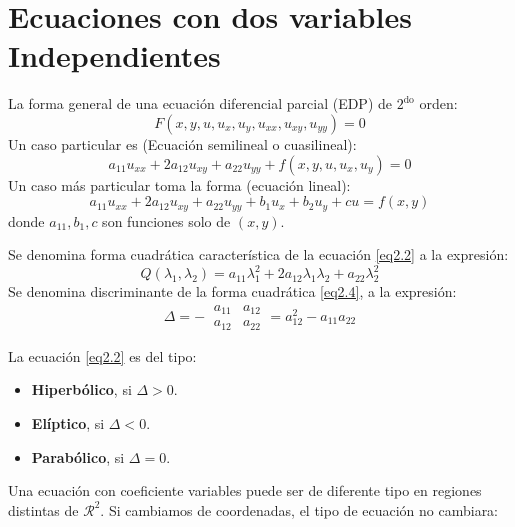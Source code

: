 \documentclass[../main]{subfiles}
\begin{document}
\section{Ecuaciones con dos variables Independientes}
La forma general de una ecuación diferencial parcial (EDP) de $2^{\text{do}}$ orden:
\begin{equation}
    F(x,y,u,u_x,u_y,u_{xx},u_{xy},u_{yy})=0
\end{equation}
Un caso particular es (Ecuación semilineal o cuasilineal):
\begin{equation}
    a_{11}u_{xx}+2a_{12}u_{xy}+a_{22}u_{yy}+f(x,y,u,u_x,u_y)=0
\end{equation}
Un caso más particular toma la forma (ecuación lineal):
\begin{equation}
    a_{11}u_{xx}+2a_{12}u_{xy}+a_{22}u_{yy}+b_1 u_x+b_2 u_y+cu=f(x,y)
    \label{eq2.2}
\end{equation}
donde $a_{11}, b_1, c$ son funciones solo de $(x,y)$.
\begin{definicion}
    Se denomina forma cuadrática característica de la ecuación \eqref{eq2.2} a la expresión:
    \begin{equation}
        Q(\lambda_1,\lambda_2)=a_{11}\lambda^2_1+2a_{12}\lambda_1\lambda_2+a_{22}\lambda^2_2 
        \label{eq2.4}
    \end{equation}
    Se denomina discriminante de la forma cuadrática \eqref{eq2.4}, a la expresión:
    \begin{equation}
    \Delta =- \
        \begin{array}{|cc|}
           a_{11}  & a_{12} \\
           a_{12}  & a_{22}
        \end{array}
        =a^2_{12}-a_{11}a_{22}
    \end{equation}
\end{definicion}
\begin{definicion}
    La ecuación \eqref{eq2.2} es del tipo:
    \begin{itemize}
        \item \textbf{Hiperbólico}, si $\Delta>0$.
        \item \textbf{Elíptico}, si $\Delta <0$.
        \item \textbf{Parabólico}, si $\Delta=0$.
    \end{itemize}
\end{definicion}
    Una ecuación con coeficiente variables puede ser de diferente tipo en regiones distintas de $\mathcal{R}^2$. Si cambiamos de coordenadas, el tipo de ecuación no cambiara:
\end{document}
